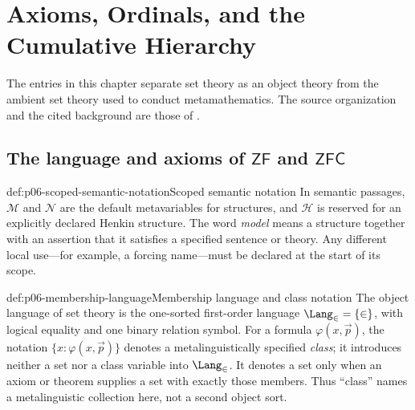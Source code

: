 
\chapter{Axioms, Ordinals, and the Cumulative Hierarchy}
\label{sec:p06-axioms-hierarchy}

The entries in this chapter separate set theory as an object theory from the
ambient set theory used to conduct metamathematics.  The source organization
and the cited background are those of \cite{Jech2003,Kunen2011}.

\section[The language and axioms of ZF and ZFC]{The language and axioms of
\(\mathsf{ZF}\) and \(\mathsf{ZFC}\)}
\label{sec:p06-zfc-axioms}

\begin{hbconvention}{def:p06-scoped-semantic-notation}{Scoped semantic notation}
In semantic passages, \(\mathcal M\) and \(\mathcal N\) are the default
metavariables for structures, and \(\mathcal H\) is reserved for an explicitly
declared Henkin structure.  The word \emph{model} means a structure together
with an assertion that it satisfies a specified sentence or theory.  Any
different local use---for example, a forcing name---must be declared at the
start of its scope.
\end{hbconvention}

\begin{hbconvention}{def:p06-membership-language}{Membership language and class notation}
The object language of set theory is the one-sorted first-order language
\(\Lang_{\in}=\{\in\}\), with logical equality and one binary relation symbol.
For a formula \(\varphi(x,\vec p)\), the notation
\(\{x:\varphi(x,\vec p)\}\) denotes a metalinguistically specified
\emph{class}; it introduces neither a set nor a class variable into
\(\Lang_{\in}\).  It denotes a set only when an axiom or theorem supplies a
set with exactly those members.  Thus ``class'' names a metalinguistic
collection here, not a second object sort.
\end{hbconvention}


